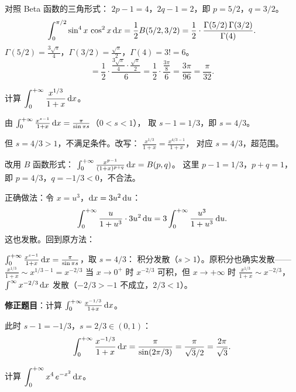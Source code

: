 \documentclass{ctexart}
\begin{document}
\begin{solution}
  对照 Beta 函数的三角形式：
  $2p-1 = 4$，$2q-1 = 2$，即 $p = 5/2$，$q = 3/2$。
  \[
    \int_0^{\pi/2}\sin^4 x\,\cos^2 x\,\mathrm{d} x
    = \frac{1}{2}B(5/2, 3/2)
    = \frac{1}{2}\cdot\frac{\Gamma(5/2)\,\Gamma(3/2)}{\Gamma(4)}.
  \]
  $\Gamma(5/2) = \frac{3\sqrt{\pi}}{4}$，$\Gamma(3/2) = \frac{\sqrt{\pi}}{2}$，$\Gamma(4) = 3! = 6$。
  \[
    = \frac{1}{2}\cdot\frac{\frac{3\sqrt{\pi}}{4}\cdot\frac{\sqrt{\pi}}{2}}{6}
    = \frac{1}{2}\cdot\frac{\frac{3\pi}{8}}{6}
    = \frac{3\pi}{96}
    = \frac{\pi}{32}.
  \]
\end{solution}

\begin{exercise}[含参积分计算]
  计算 $\displaystyle\int_0^{+\infty} \frac{x^{1/3}}{1+x}\,\mathrm{d} x$。
\end{exercise}

\begin{solution}
  由 $\int_0^{+\infty}\frac{x^{s-1}}{1+x}\,\mathrm{d} x = \frac{\pi}{\sin\pi s}$（$0 < s < 1$），
  取 $s-1 = 1/3$，即 $s = 4/3$。

  但 $s = 4/3 > 1$，不满足条件。改写：
  $\frac{x^{1/3}}{1+x} = \frac{x^{4/3-1}}{1+x}$，
  对应 $s = 4/3$，超范围。

  改用 $B$ 函数形式：
  $\int_0^{+\infty}\frac{x^{p-1}}{(1+x)^{p+q}}\,\mathrm{d} x = B(p,q)$。
  这里 $p - 1 = 1/3$，$p + q = 1$，即 $p = 4/3$，$q = -1/3 < 0$，不合法。

  正确做法：令 $x = u^3$，$\mathrm{d} x = 3u^2\,\mathrm{d} u$：
  \[
    \int_0^{+\infty}\frac{u}{1+u^3}\cdot 3u^2\,\mathrm{d} u
    = 3\int_0^{+\infty}\frac{u^3}{1+u^3}\,\mathrm{d} u.
  \]
  这也发散。回到原方法：

  $\int_0^{+\infty}\frac{x^{s-1}}{1+x}\,\mathrm{d} x = \frac{\pi}{\sin\pi s}$，取 $s = 4/3$：
  积分发散（$s > 1$）。原积分也确实发散——$\frac{x^{1/3}}{1+x} \sim x^{1/3-1} = x^{-2/3}$
  当 $x \to 0^+$ 时 $x^{-2/3}$ 可积，但 $x \to +\infty$ 时 $\frac{x^{1/3}}{1+x} \sim x^{-2/3}$，
  $\int^\infty x^{-2/3}\,\mathrm{d} x$ 发散（$-2/3 > -1$ 不成立，$2/3 < 1$）。

  \textbf{修正题目}：计算 $\int_0^{+\infty}\frac{x^{-1/3}}{1+x}\,\mathrm{d} x$。

  此时 $s-1 = -1/3$，$s = 2/3 \in (0,1)$：
  \[
    \int_0^{+\infty}\frac{x^{-1/3}}{1+x}\,\mathrm{d} x
    = \frac{\pi}{\sin(2\pi/3)} = \frac{\pi}{\sqrt{3}/2} = \frac{2\pi}{\sqrt{3}}.
  \]
\end{solution}

\begin{exercise}
  计算 $\displaystyle\int_0^{+\infty} x^4\,e^{-x^2}\,\mathrm{d} x$。
\end{exercise}
\end{document}
